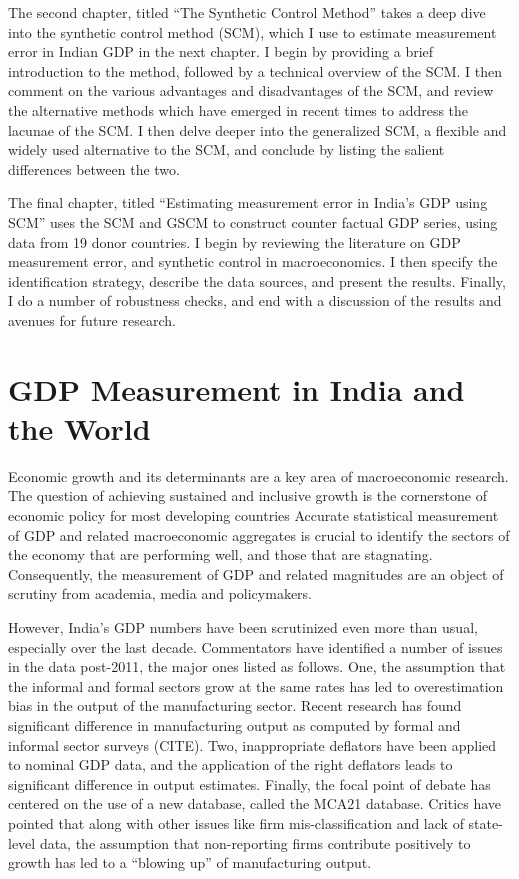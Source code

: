 \documentclass[12pt,nobind, a4paper]{reedthesis}
\begin{document}
 The second chapter, titled ``The Synthetic Control Method'' takes a deep dive into the synthetic control method (SCM), which I use to estimate measurement error in Indian GDP in the next chapter. I begin by providing a brief introduction to the method, followed by a technical overview of the SCM. I then comment on the various advantages and disadvantages of the SCM, and review the alternative methods which have emerged in recent times to address the lacunae of the SCM. I then delve deeper into the generalized SCM, a flexible and widely used alternative to the SCM, and conclude by listing the salient differences between the two.
 \linebreak

 The final chapter, titled ``Estimating measurement error in India's GDP using SCM'' uses the SCM and GSCM to construct counter factual GDP series, using data from 19 donor countries. I begin by reviewing the literature on GDP measurement error, and synthetic control in macroeconomics. I then specify the identification strategy, describe the data sources, and present the results. Finally, I do a number of robustness checks, and end with a discussion of the results and avenues for future research.

 \hypertarget{gdp-measurement-in-india-and-the-world}{%
 \chapter{GDP Measurement in India and the World}\label{gdp-measurement-in-india-and-the-world}}

 Economic growth and its determinants are a key area of macroeconomic research. The question of achieving sustained and inclusive growth is the cornerstone of economic policy for most developing countries Accurate statistical measurement of GDP and related macroeconomic aggregates is crucial to identify the sectors of the economy that are performing well, and those that are stagnating. Consequently, the measurement of GDP and related magnitudes are an object of scrutiny from academia, media and policymakers.
 \linebreak

 However, India's GDP numbers have been scrutinized even more than usual, especially over the last decade. Commentators have identified a number of issues in the data post-2011, the major ones listed as follows. One, the assumption that the informal and formal sectors grow at the same rates has led to overestimation bias in the output of the manufacturing sector. Recent research has found significant difference in manufacturing output as computed by formal and informal sector surveys (CITE). Two, inappropriate deflators have been applied to nominal GDP data, and the application of the right deflators leads to significant difference in output estimates. Finally, the focal point of debate has centered on the use of a new database, called the MCA21 database. Critics have pointed that along with other issues like firm mis-classification and lack of state-level data, the assumption that non-reporting firms contribute positively to growth has led to a ``blowing up'' of manufacturing output.
 \linebreak
\end{document}
